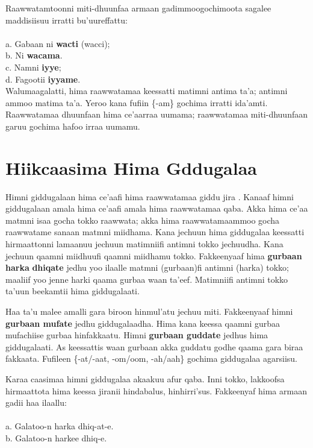 \documentclass[11pt,b5paper]{book}
\begin{document}
Raawwatamtoonni miti-dhuunfaa armaan gadimmoogochimoota sagalee maddisiisuu irratti bu’uureffattu:\\
\\
a. Gabaan ni \textbf{wacti} (wacci);\\
b. Ni \textbf{wacama}.\\
c. Namni \textbf{iyye}; \\
d. Fagootii \textbf{iyyame}.\\

Walumaagalatti, hima raawwatamaa keessatti matimni antima ta’a; antimni ammoo matima ta’a. Yeroo kana fufiin \{-am\} gochima irratti ida’amti. Raawwatamaa dhuunfaan hima ce’aarraa uumama; raawwatamaa miti-dhuunfaan garuu gochima hafoo irraa uumamu. 

\section{Hiikcaasima Hima Gddugalaa}

Himni giddugalaan hima ce’aafi hima raawwatamaa giddu jira \cite{kemmer1993middle,tolemariam2009}. Kanaaf himni giddugalaan amala hima ce’aafi amala hima raawwatamaa qaba. Akka hima ce’aa matmni isaa gocha tokko raawwata; akka hima raawwatamaammoo gocha raawwatame sanaan matmni miidhama. Kana jechuun hima giddugalaa keessatti hirmaattonni lamaanuu jechuun matimniifi antimni tokko jechuudha. Kana jechuun qaamni miidhuufi qaamni miidhamu tokko. Fakkeenyaaf hima \textbf{gurbaan harka} \textbf{dhiqate} jedhu yoo ilaalle matmni (gurbaan)fi antimni (harka) tokko; maaliif yoo jenne harki qaama gurbaa waan ta’eef.
Matimniifi antimni tokko ta’uun beekamtii hima giddugalaati. 

Haa ta’u malee amalli gara biroon hinmul’atu jechuu miti. Fakkeenyaaf himni \textbf{gurbaan mufate} jedhu giddugalaadha. Hima kana keessa qaamni gurbaa mufachiise gurbaa hinfakkaatu. Himni \textbf{gurbaan guddate }jedhus hima giddugalaati. As keessattis waan gurbaan akka guddatu godhe
qaama gara biraa fakkaata. Fufileen \{-at/-aat, -om/oom, -ah/aah\} gochima giddugalaa agarsiisu.

Karaa caasimaa himni giddugalaa akaakuu afur qaba. Inni
tokko, lakkoofsa hirmaattota hima keessa jiranii hindabalus,
hinhirri’sus. Fakkeenyaf hima armaan gadii haa ilaallu: \\
\\
a. Galatoo-n harka dhiq-at-e.\\
b. Galatoo-n harkee dhiq-e.\\
\end{document}
